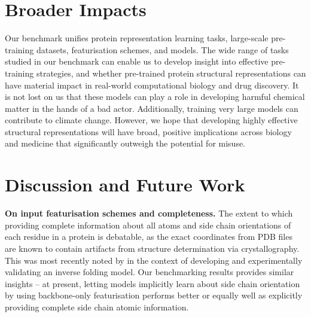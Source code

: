 \appendix
\appendixtoc

\newpage

\section{Broader Impacts}
Our benchmark unifies protein representation learning tasks, large-scale pre-training datasets, featurisation schemes, and models.
The wide range of tasks studied in our benchmark can enable us to develop insight into effective pre-training strategies, and whether pre-trained protein structural representations can have material impact in real-world computational biology and drug discovery. It is not lost on us that these models can play a role in developing harmful chemical matter in the hands of a bad actor. Additionally, training very large models can contribute to climate change. However, we hope that developing highly effective structural representations will have broad, positive implications across biology and medicine that significantly outweigh the potential for misuse.





\section{Discussion and Future Work}

\textbf{On input featurisation schemes and completeness. }
The extent to which providing complete information about all atoms and side chain orientations of each residue in a protein is debatable, as the exact coordinates from PDB files are known to contain artifacts from structure determination via crystallography. 
This was most recently noted by \citet{Dauparas2022} in the context of developing and experimentally validating an inverse folding model.
Our benchmarking results provides similar insights -- at present, letting models implicitly learn about side chain orientation by using backbone-only featurisation performs better or equally well as explicitly providing complete side chain atomic information.

